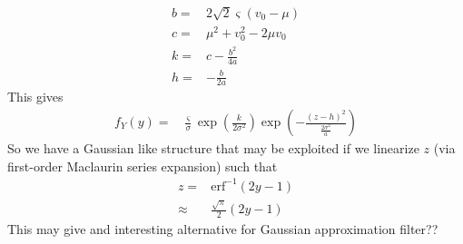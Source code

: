 \documentclass{article}
\begin{document}
{\begin{align}
	b =& 2\sqrt{2}\varsigma\left(v_0-\mu\right) \nonumber \\
	c =& \mu^2 + v_0^2 - 2\mu v_0 \nonumber \\
	k =& c - \frac{b^2}{4a}\nonumber \\
	h =& - \frac{b}{2a}\nonumber
\end{align}
This gives
\begin{align}
	f_Y(y)=& \frac{\varsigma}{\sigma}\exp\left(\frac{k}{2\sigma^2}\right)\exp\left(-\frac{ (z - h)^2}{\frac{2\sigma^2}{a}}\right)
\end{align}
So we have a Gaussian like structure that may be exploited if we linearize $z$ (via first-order Maclaurin series expansion) such that
\begin{align}
	z =& \mathrm{erf}^{-1}\left(2y-1\right) \\
	\approx& \frac{\sqrt{\pi}}{2}\left(2y-1\right)
\end{align}
This may give and interesting alternative for Gaussian approximation filter??
}
\end{document}
